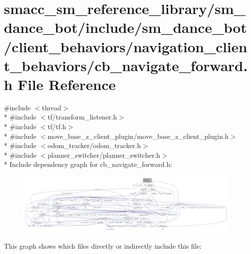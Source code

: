 \hypertarget{smacc__sm__reference__library_2sm__dance__bot_2include_2sm__dance__bot_2client__behaviors_2navigf82d6caf70a462cd63a6e37552d133b3}{}\section{smacc\+\_\+sm\+\_\+reference\+\_\+library/sm\+\_\+dance\+\_\+bot/include/sm\+\_\+dance\+\_\+bot/client\+\_\+behaviors/navigation\+\_\+client\+\_\+behaviors/cb\+\_\+navigate\+\_\+forward.h File Reference}
\label{smacc__sm__reference__library_2sm__dance__bot_2include_2sm__dance__bot_2client__behaviors_2navigf82d6caf70a462cd63a6e37552d133b3}
{\ttfamily \#include $<$thread$>$}\\*
{\ttfamily \#include $<$tf/transform\+\_\+listener.\+h$>$}\\*
{\ttfamily \#include $<$tf/tf.\+h$>$}\\*
{\ttfamily \#include $<$move\+\_\+base\+\_\+z\+\_\+client\+\_\+plugin/move\+\_\+base\+\_\+z\+\_\+client\+\_\+plugin.\+h$>$}\\*
{\ttfamily \#include $<$odom\+\_\+tracker/odom\+\_\+tracker.\+h$>$}\\*
{\ttfamily \#include $<$planner\+\_\+switcher/planner\+\_\+switcher.\+h$>$}\\*
Include dependency graph for cb\+\_\+navigate\+\_\+forward.\+h\+:
\nopagebreak
\begin{figure}[H]
\begin{center}
\leavevmode
\includegraphics[width=350pt]{smacc__sm__reference__library_2sm__dance__bot_2include_2sm__dance__bot_2client__behaviors_2navig6bf0f33e99611b034fa3f98b637ae798}
\end{center}
\end{figure}
This graph shows which files directly or indirectly include this file\+:
